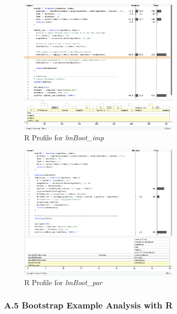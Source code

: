 \documentclass[]{article}
\begin{document}
\begin{figure}
\centering
\includegraphics[width=0.69000\textwidth]{Profiling/lmBoot_imp Profile Image.png}
\caption{R Profile for \emph{lmBoot\_imp}}
\end{figure}

\begin{figure}
\centering
\includegraphics[width=0.69000\textwidth]{Profiling/lmBoot_par Profile Image.png}
\caption{R Profile for \emph{lmBoot\_par}}
\end{figure}

\pagebreak

\subsubsection{A.5 Bootstrap Example Analysis with
R}\label{a.5-bootstrap-example-analysis-with-r}
\end{document}
